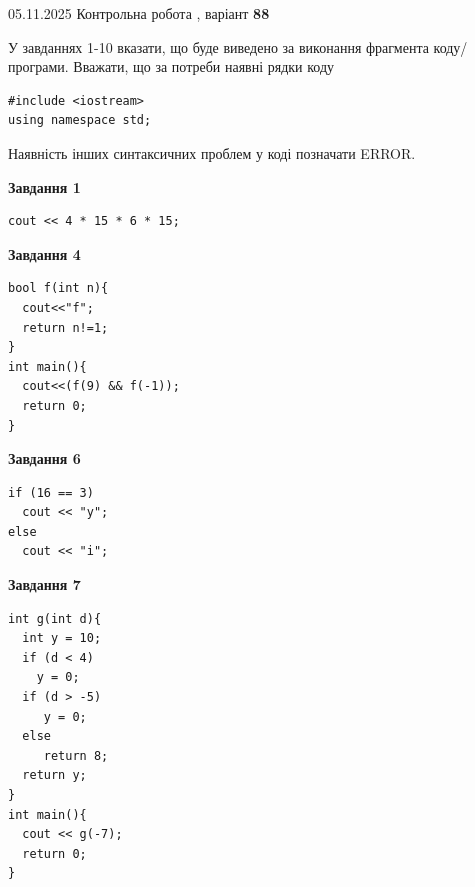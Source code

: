 \documentclass[12pt, ukrainian]{article}
\begin{document}
{\Large{05.11.2025 Контрольна робота , варіант  \No \textbf { 88 }\par}}
{
\begin {large}
У завданнях 1-10 вказати, що буде виведено за виконання фрагмента коду/про\-гра\-ми.
Вважати, що за потреби наявні рядки коду
\begin{verbatim}
#include <iostream>
using namespace std;
\end{verbatim}
Наявність інших синтаксичних проблем у коді позначати ERROR.

\begin{minipage}[t]{7.0cm}

\begin{center}
\textbf{Завдання 1}
\end{center}
\vspace{-8mm}

\begin{verbatim}
cout << 4 * 15 * 6 * 15;
\end{verbatim}



\begin{center}
\textbf{Завдання 4}
\end{center}
\vspace{-8mm}

\begin{verbatim}
bool f(int n){
  cout<<"f";
  return n!=1;
}
int main(){
  cout<<(f(9) && f(-1));
  return 0;
}
\end{verbatim}



\begin{center}
\textbf{Завдання 6}
\end{center}
\vspace{-8mm}

\begin{verbatim}
if (16 == 3)
  cout << "y";
else
  cout << "i";
\end{verbatim}



\begin{center}
\textbf{Завдання 7}
\end{center}
\vspace{-8mm}

\begin{verbatim}
int g(int d){
  int y = 10;
  if (d < 4)
    y = 0;
  if (d > -5)
     y = 0;
  else
     return 8;
  return y;
}
int main(){
  cout << g(-7);
  return 0;
}
\end{verbatim}


\end{minipage}
\end{large}}
\end{document}
